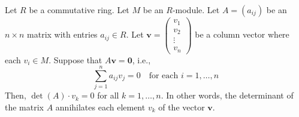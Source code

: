 \begin{theorem}
Let $R$ be a commutative ring.
Let $M$ be an $R$-module.
Let $A = (a_{ij})$ be an $n \times n$ matrix with entries $a_{ij} \in R$.
Let $\boldsymbol{v} = \begin{pmatrix} v_1 \\ v_2 \\ \vdots \\ v_n \end{pmatrix}$ be a column vector where each $v_i \in M$.
Suppose that $A \boldsymbol{v} = \boldsymbol{0}$, i.e.,
\[
\sum_{j=1}^{n} a_{ij} v_j = 0 \quad \text{for each } i = 1, \ldots, n
\]
Then, $\det(A) \cdot v_k = 0$ for all $k = 1, \ldots, n$.
In other words, the determinant of the matrix $A$ annihilates each element $v_k$ of the vector $\boldsymbol{v}$.
\end{theorem}
